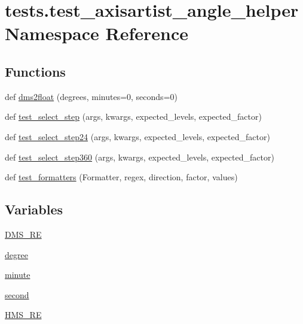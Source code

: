 \hypertarget{namespacetests_1_1test__axisartist__angle__helper}{}\section{tests.\+test\+\_\+axisartist\+\_\+angle\+\_\+helper Namespace Reference}
\label{namespacetests_1_1test__axisartist__angle__helper}
\subsection*{Functions}
\begin{DoxyCompactItemize}
\item 
def \hyperlink{namespacetests_1_1test__axisartist__angle__helper_aa46892f02b2260f486db71288a305504}{dms2float} (degrees, minutes=0, seconds=0)
\item 
def \hyperlink{namespacetests_1_1test__axisartist__angle__helper_a98992a8dd0794e87175da2ba3387809c}{test\+\_\+select\+\_\+step} (args, kwargs, expected\+\_\+levels, expected\+\_\+factor)
\item 
def \hyperlink{namespacetests_1_1test__axisartist__angle__helper_a86e2029a635e337a553379f6941c51c2}{test\+\_\+select\+\_\+step24} (args, kwargs, expected\+\_\+levels, expected\+\_\+factor)
\item 
def \hyperlink{namespacetests_1_1test__axisartist__angle__helper_a2f7cd190702d438605cd97d0b0135cdb}{test\+\_\+select\+\_\+step360} (args, kwargs, expected\+\_\+levels, expected\+\_\+factor)
\item 
def \hyperlink{namespacetests_1_1test__axisartist__angle__helper_a06f8a1659851f5f1f82f29fa1c3a56c6}{test\+\_\+formatters} (Formatter, regex, direction, factor, values)
\end{DoxyCompactItemize}
\subsection*{Variables}
\begin{DoxyCompactItemize}
\item 
\hyperlink{namespacetests_1_1test__axisartist__angle__helper_a6bce771add551ab176b245dd734af802}{D\+M\+S\+\_\+\+RE}
\item 
\hyperlink{namespacetests_1_1test__axisartist__angle__helper_aee09042fd7542d743cd21361b525e5a1}{degree}
\item 
\hyperlink{namespacetests_1_1test__axisartist__angle__helper_a88110bb853e02a1b49c8d7ac6efbe198}{minute}
\item 
\hyperlink{namespacetests_1_1test__axisartist__angle__helper_a4a0014becf73cf13c87d879f3d132588}{second}
\item 
\hyperlink{namespacetests_1_1test__axisartist__angle__helper_a1d7c34f72c0ae2f8f48276768089a4a6}{H\+M\+S\+\_\+\+RE}
\end{DoxyCompactItemize}


